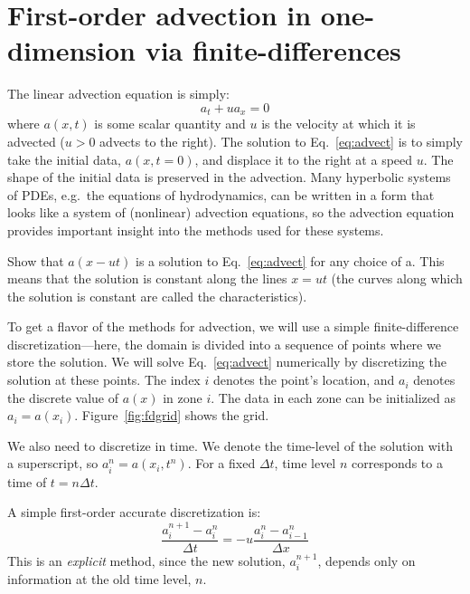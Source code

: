 
\begin{quote}
\end{quote}


\section{First-order advection in one-dimension via finite-differences}

The linear advection equation is simply:
\begin{equation}
\label{eq:advect}
a_t + u a_x = 0
\end{equation}
where $a(x,t)$ is some scalar quantity and $u$ is the velocity at
which it is advected ($u > 0$ advects to the right).  The solution to
Eq.~\ref{eq:advect} is to simply take the initial data, $a(x,t=0)$,
and displace it to the right at a speed $u$.  The shape of the initial
data is preserved in the advection.  Many hyperbolic systems of PDEs,
e.g.\ the equations of hydrodynamics, can be written in a form that
looks like a system of (nonlinear) advection equations, so the
advection equation provides important insight into the methods used
for these systems.
%
\begin{exercise}
{Show that $a(x - ut)$ is a solution to
  Eq.~\ref{eq:advect} for any choice of a.  This means that
the solution is constant along the lines $x = u t$
(the curves along which the solution is constant are called the
characteristics).}
\end{exercise}

To get a flavor of the methods for advection, we will use a simple
finite-difference discretization---here, the domain is divided into
a sequence of points where we store the solution.
We will solve
Eq.~\ref{eq:advect} numerically by discretizing the solution at
these points.  The index $i$ denotes the point's location, and $a_i$
denotes the discrete value of $a(x)$ in zone $i$.  The data in each
zone can be initialized as $a_i = a(x_i)$.  Figure~\ref{fig:fdgrid}
shows the grid.

We also need to discretize in time.  We denote the time-level of the
solution with a superscript, so $a_i^n = a(x_i,t^n)$.  For a fixed
$\Delta t$, time level $n$ corresponds to a time of $t = n\Delta t$.


A simple first-order accurate discretization is:
\begin{equation}
\frac{a_i^{n+1} - a_i^n}{\Delta t} = - u \frac{a_i^n - a_{i-1}^n}{\Delta x}
\label{eq:fo}
\end{equation}
This is an {\em explicit} method, since the new solution, $a_i^{n+1}$,
depends only on information at the old time level, $n$.  

